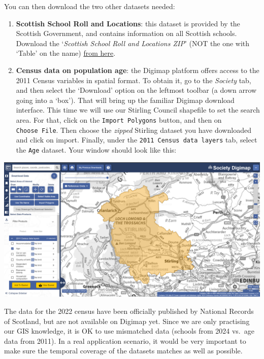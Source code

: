 \documentclass[
  letterpaper,
  DIV=11,
  numbers=noendperiod]{scrreprt}
\begin{document}
You can then download the two other datasets needed:

\begin{enumerate}
\def\labelenumi{(\arabic{enumi})}
\setcounter{enumi}{278}
\item
  \textbf{Scottish School Roll and Locations}: this dataset is provided
  by the Scottish Government, and contains information on all Scottish
  schools. Download the `\emph{Scottish School Roll and Locations ZIP}'
  (NOT the one with `Table' on the name)
  \href{https://www.data.gov.uk/dataset/9a6f9d86-9698-4a5d-a2c8-89f3b212c52c/scottish-school-roll-and-locations}{from
  here}.
\item
  \textbf{Census data on population age}: the Digimap platform offers
  access to the 2011 Census variables in spatial format. To obtain it,
  go to the \emph{Society} tab, and then select the `Download' option on
  the leftmost toolbar (a down arrow going into a `box'). That will
  bring up the familiar Digimap download interface. This time we will
  use our Stirling Council shapefile to set the search area. For that,
  click on the \texttt{Import\ Polygons} button, and then on
  \texttt{Choose\ File}. Then choose the \emph{zipped} Stirling dataset
  you have downloaded and click on import. Finally, under the
  \texttt{2011\ Census\ data\ layers} tab, select the \texttt{Age}
  dataset. Your window should look like this:
\end{enumerate}

\includegraphics{images/lab_geoprocessing/Fig1_digimap_stirlinghsire.png}

\begin{tcolorbox}[enhanced jigsaw, coltitle=black, toprule=.15mm, breakable, opacitybacktitle=0.6, left=2mm, colback=white, leftrule=.75mm, rightrule=.15mm, colbacktitle=quarto-callout-warning-color!10!white, toptitle=1mm, titlerule=0mm, colframe=quarto-callout-warning-color-frame, arc=.35mm, bottomtitle=1mm, opacityback=0, bottomrule=.15mm, title=\textcolor{quarto-callout-warning-color}{\faExclamationTriangle}\hspace{0.5em}{Warning}]

The data for the 2022 census have been officially published by National
Records of Scotland, but are not available on Digimap yet. Since we are
only practising our GIS knowledge, it is OK to use mismatched data
(schools from 2024 vs.~age data from 2011). In a real application
scenario, it would be very important to make sure the temporal coverage
of the datasets matches as well as possible.

\end{tcolorbox}
\end{document}
